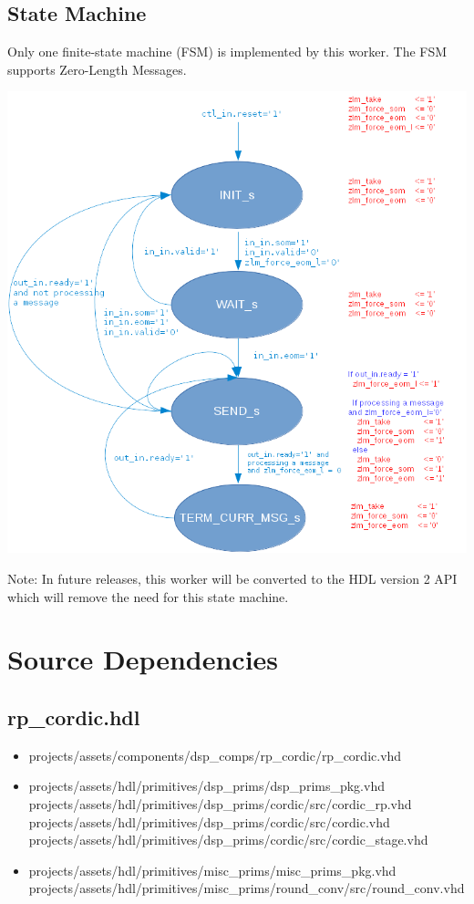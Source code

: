 \documentclass{article}
\def\comp{rp\_cordic}
\begin{document}
\subsection*{State Machine}
\begin{flushleft}
	Only one finite-state machine (FSM) is implemented by this worker. The FSM supports Zero-Length Messages.
\end{flushleft}
{\centering\captionsetup{type=figure}\includegraphics[scale=0.3]{rp_cordic_zlm_fsm}\par{}\label{fig:rp_cordic_zlm_fsm}}
\begin{flushleft}
        Note: In future releases, this worker will be converted to the HDL version 2 API which will remove the need for this state machine.
\end{flushleft}


\newpage

\section*{Source Dependencies}
\subsection*{\comp.hdl}
\begin{itemize}
	\item projects/assets/components/dsp\_comps/rp\_cordic/rp\_cordic.vhd
	\item projects/assets/hdl/primitives/dsp\_prims/dsp\_prims\_pkg.vhd
	      \subitem projects/assets/hdl/primitives/dsp\_prims/cordic/src/cordic\_rp.vhd
	      \subitem projects/assets/hdl/primitives/dsp\_prims/cordic/src/cordic.vhd
	      \subitem projects/assets/hdl/primitives/dsp\_prims/cordic/src/cordic\_stage.vhd
	\item projects/assets/hdl/primitives/misc\_prims/misc\_prims\_pkg.vhd
	      \subitem projects/assets/hdl/primitives/misc\_prims/round\_conv/src/round\_conv.vhd
\end{itemize}
\end{document}

